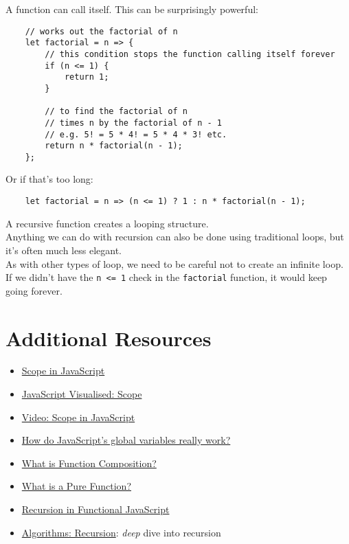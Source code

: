 
A function can call itself. This can be surprisingly powerful:

\begin{verbatim}
    // works out the factorial of n
    let factorial = n => {
        // this condition stops the function calling itself forever
        if (n <= 1) {
            return 1;
        }

        // to find the factorial of n
        // times n by the factorial of n - 1
        // e.g. 5! = 5 * 4! = 5 * 4 * 3! etc.
        return n * factorial(n - 1);
    };
\end{verbatim}

Or if that's too long:

\begin{verbatim}
    let factorial = n => (n <= 1) ? 1 : n * factorial(n - 1);
\end{verbatim}

A recursive function creates a looping structure.
\\

Anything we can do with recursion can also be done using traditional loops, but it's often much less elegant.
\\

As with other types of loop, we need to be careful not to create an infinite loop. If we didn't have the \texttt{n <= 1} check in the \texttt{factorial} function, it would keep going forever.

\pagebreak

\section{Additional Resources}

\begin{itemize}[leftmargin=*]
    \item \href{https://scotch.io/tutorials/understanding-scope-in-javascript}{Scope in JavaScript}
    \item \href{https://dev.to/lydiahallie/javascript-visualized-scope-chain-13pd}{JavaScript Visualised: Scope}
    \item \href{https://www.youtube.com/watch?v=5LEuJNLfLN0}{Video: Scope in JavaScript}
    \item \href{https://2ality.com/2019/07/global-scope.html}{How do JavaScript’s global variables really work?}
    \item \href{https://medium.com/javascript-scene/master-the-javascript-interview-what-is-function-composition-20dfb109a1a0}{What is Function Composition?}
    \item \href{https://medium.com/javascript-scene/master-the-javascript-interview-what-is-a-pure-function-d1c076bec976}{What is a Pure Function?}
    \item \href{https://www.sitepoint.com/recursion-functional-javascript/}{Recursion in Functional JavaScript}
    \item \href{http://jeffe.cs.illinois.edu/teaching/algorithms/book/01-recursion.pdf}{Algorithms: Recursion}: \textit{deep} dive into recursion
\end{itemize}
